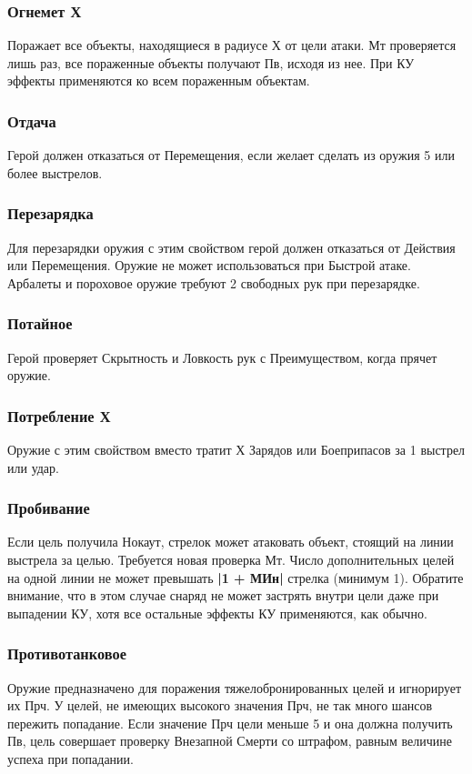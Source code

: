 \subsubsection{Огнемет Х} Поражает все объекты, находящиеся в радиусе Х от цели атаки. Мт проверяется лишь раз, все пораженные объекты получают Пв, исходя из нее. При КУ эффекты применяются ко всем пораженным объектам.
\subsubsection{Отдача} Герой должен отказаться от Перемещения, если желает сделать из оружия 5 или более выстрелов.
\subsubsection{Перезарядка} Для перезарядки оружия с этим свойством герой должен отказаться от Действия или Перемещения. Оружие не может использоваться при Быстрой атаке. Арбалеты и пороховое оружие требуют 2 свободных рук при перезарядке.
\subsubsection{Потайное} Герой проверяет Скрытность и Ловкость рук с Преимуществом, когда прячет оружие.
\subsubsection{Потребление Х} Оружие с этим свойством вместо тратит Х Зарядов или Боеприпасов за 1 выстрел или удар.
\subsubsection{Пробивание} Если цель получила Нокаут, стрелок может атаковать объект, стоящий на линии выстрела за целью. Требуется новая проверка Мт. Число дополнительных целей на одной линии не может превышать \textbf{|1 + МИн|} стрелка (минимум 1). Обратите внимание, что в этом случае снаряд не может застрять внутри цели даже при выпадении КУ, хотя все остальные эффекты КУ применяются, как обычно.
\subsubsection{Противотанковое} Оружие предназначено для поражения тяжелобронированных целей и игнорирует их Прч. У целей, не имеющих высокого значения Прч, не так много шансов пережить попадание. Если значение Прч цели меньше 5 и она должна получить Пв, цель совершает проверку Внезапной Смерти со штрафом, равным величине успеха при попадании.
